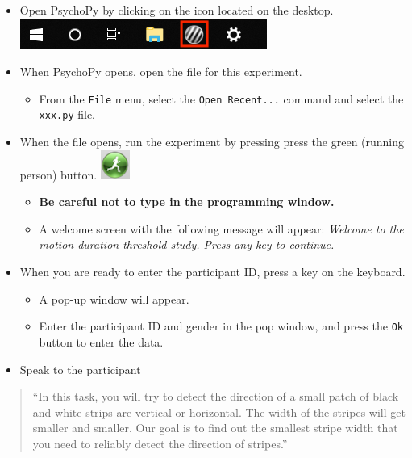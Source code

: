 \documentclass[]{article}
\providecommand{\tightlist}{%
  \setlength{\itemsep}{0pt}\setlength{\parskip}{0pt}}
\begin{document}
\begin{itemize}
\tightlist
\item
  Open PsychoPy by clicking on the icon located on the desktop.
  \includegraphics{images/PsychoPy-1.PNG}\\
\item
  When PsychoPy opens, open the file for this experiment.

  \begin{itemize}
  \tightlist
  \item
    From the \texttt{File} menu, select the \texttt{Open\ Recent...}
    command and select the \texttt{xxx.py} file.
  \end{itemize}
\item
  When the file opens, run the experiment by pressing press the green
  (running person) button. \includegraphics{images/PPrunningMan.png}

  \begin{itemize}
  \tightlist
  \item
    \textbf{Be careful not to type in the programming window.}
  \item
    A welcome screen with the following message will appear:
    \emph{Welcome to the motion duration threshold study. Press any key
    to continue.}
  \end{itemize}
\item
  When you are ready to enter the participant ID, press a key on the
  keyboard.

  \begin{itemize}
  \tightlist
  \item
    A pop-up window will appear.
  \item
    Enter the participant ID and gender in the pop window, and press the
    \texttt{Ok} button to enter the data.
  \end{itemize}
\item
  Speak to the participant
\end{itemize}

\begin{quote}
``In this task, you will try to detect the direction of a small patch of
black and white strips are vertical or horizontal. The width of the
stripes will get smaller and smaller. Our goal is to find out the
smallest stripe width that you need to reliably detect the direction of
stripes.''
\end{quote}
\end{document}
